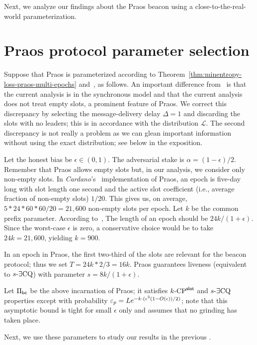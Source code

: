 

Next, 
we analyze our findings about the Praos beacon 
using a close-to-the-real-world parameterization.


\section{Praos protocol parameter selection}\label{sec:praos-params}
Suppose that Praos is parameterized according to 
Theorem~\ref{thm:minentropy-loss-praos-multi-epochs} 
and~\cite[Theorem 9]{Praos}, as follows.
An important difference from~\cite[Theorem 9]{Praos} is that 
the current analysis is in the synchronous model 
and that the current analysis does not treat empty slots, a prominent feature of Praos. 
We correct this discrepancy by selecting the message-delivery delay $\Delta = 1$ 
and discarding the slots with no leaders; 
this is in accordance with the distribution $\mathcal{L}$. 
The second discrepancy is not really a problem 
as we can glean important information without using the exact distribution; 
see below in the exposition.

Let the honest bias be $\epsilon \in (0,1)$.
The adversarial stake is $\alpha = (1-\epsilon)/2$. 
Remember that Praos allows empty slots but, 
in our analysis, we consider only non-empty slots. 
In \emph{Cardano}'s~\cite{Cardano} implementation of Praos, 
an epoch is five-day long with slot length one second 
and the active slot coefficient (i.e., average fraction of non-empty slots)  $1/20$. 
This gives us, on average, $5*24*60*60/20 = 21,600$ non-empty slots per epoch.
Let $k$ be the common prefix parameter.  
According to~\cite[Corollary 3]{Praos}, 
The length of an epoch should be $24 k/(1+\epsilon)$. 
Since the worst-case $\epsilon$ is zero, 
a conservative choice would be to take $24 k = 21,600$, yielding $k = 900$. 


In an epoch in Praos, the first two-third of the slots 
are relevant for the beacon protocol; 
thus we set $T = 24k * 2/3 = 16 k$. 
Praos guarantees liveness (equivalent to ${s}\text{-}\exists\mathrm{CQ}$) 
with parameter $s = 8 k/(1+\epsilon)$. 

Let $\Pi_\mathsf{bc}$ be the above incarnation of Praos; 
it satisfies ${k}\text{-}\mathrm{CP}^{\mathsf{slot}}$ and ${s}\text{-}\exists\mathrm{CQ}$ properties 
except with probability 
$\mathsf{\varepsilon}_p = L e^{-k \cdot (\epsilon^3 (1- O(\epsilon) )/2 )}$; 
note that this asymptotic bound is tight for small $\epsilon$ only 
and assumes that no grinding has taken place.

Next, we use these parameters to study our results in the previous \Section. 







